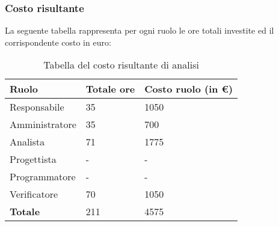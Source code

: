 \clearpage

\subsubsection{Costo risultante}
La seguente tabella rappresenta per ogni ruolo le ore totali investite ed il corrispondente costo in euro:
{
\renewcommand{\arraystretch}{2}
\begin{longtable}{ C{3cm} C{2cm} C{4cm}}
\caption{Tabella del costo risultante di analisi}\\
\rowcolor{\primaryColor}

\textcolor{\secondaryColor}{\textbf{Ruolo}} & 
\textcolor{\secondaryColor}{\textbf{Totale ore}} & 
\textcolor{\secondaryColor}{\textbf{Costo ruolo (in \euro{})}}\\	
\endhead

Responsabile    &  35 &  1050 \\
Amministratore  &  35 &  700 \\
Analista        &  71 & 1775 \\
Progettista     &   - &  - \\
Programmatore   &   - &  - \\
Verificatore    &  70 & 1050 \\
\textbf{Totale} & 211 & 4575 \\
		
\end{longtable}
}

